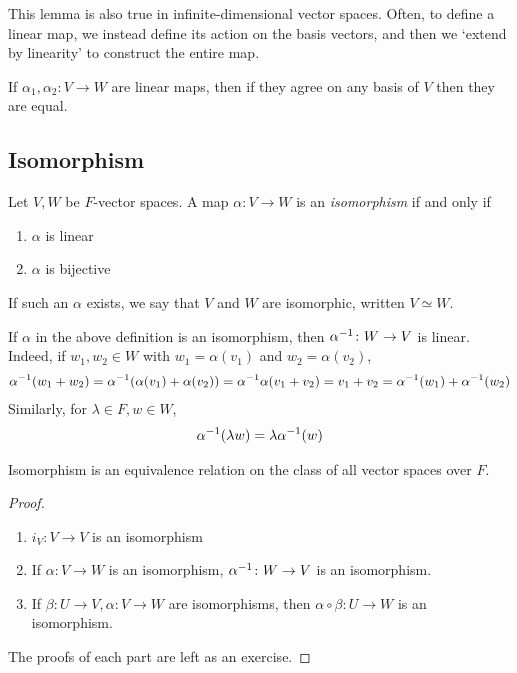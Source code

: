 \begin{remark}
    This lemma is also true in infinite-dimensional vector spaces.
    Often, to define a linear map, we instead define its action on the basis vectors, and then we `extend by linearity' to construct the entire map.
\end{remark}
\begin{remark}
    If $\alpha_1, \alpha_2 \colon V \to W$ are linear maps, then if they agree on any basis of $V$ then they are equal.
\end{remark}

\subsection{Isomorphism}
\begin{definition}
    Let $V, W$ be $F$-vector spaces.
    A map $\alpha \colon V \to W$ is an \textit{isomorphism} if and only if
    \begin{enumerate}
        \item $\alpha$ is linear
        \item $\alpha$ is bijective
    \end{enumerate}
    If such an $\alpha$ exists, we say that $V$ and $W$ are isomorphic, written $V \simeq W$.
\end{definition}
\begin{remark}
    If $\alpha$ in the above definition is an isomorphism, then $\alpha^{-1} \colon W \to V$ is linear.
    Indeed, if $w_1, w_2 \in W$ with $w_1 = \alpha(v_1)$ and $w_2 = \alpha(v_2)$,
    \begin{align*}
        \alpha^{-1} (w_1 + w_2) = \alpha^{-1} (\alpha(v_1) + \alpha(v_2)) = \alpha^{-1} \alpha (v_1 + v_2) = v_1 + v_2 = \alpha^{-1}(w_1) + \alpha^{-1}(w_2)
    \end{align*}
    Similarly, for $\lambda \in F, w \in W$,
    \begin{align*}
        \alpha^{-1}(\lambda w) = \lambda \alpha^{-1}(w)
    \end{align*}
\end{remark}
\begin{lemma}
    Isomorphism is an equivalence relation on the class of all vector spaces over $F$.
\end{lemma}
\begin{proof}
    \begin{enumerate}
        \item $i_V \colon V \to V$ is an isomorphism
        \item If $\alpha \colon V \to W$ is an isomorphism, $\alpha^{-1} \colon W \to V$ is an isomorphism.
        \item If $\beta \colon U \to V, \alpha \colon V \to W$ are isomorphisms, then $\alpha \circ \beta \colon U \to W$ is an isomorphism.
    \end{enumerate}
    The proofs of each part are left as an exercise.
\end{proof}
